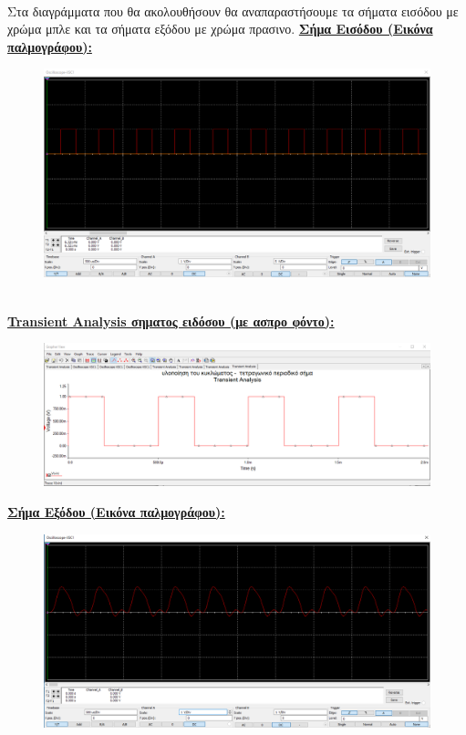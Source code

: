 \documentclass{article}
\begin{document}
{\begin{figure}[h!]
\end{figure} 
\\
Στα διαγράμματα που θα ακολουθήσουν θα αναπαραστήσουμε τα σήματα εισόδου με χρώμα μπλε και τα σήματα εξόδου με χρώμα πρασινο.
\clearpage
\textbf{\underline{Σήμα Εισόδου (Εικόνα παλμογράφου):}}
\begin{figure}[h!]
\centering
 	\advance\leftskip-3cm
  \includegraphics[width=180mm,scale=2]{input.png}
\end{figure} \\
\textbf{\underline{Transient Analysis σηματος ειδόσου (με ασπρο φόντο):}}
\begin{figure}[h!]
\centering
 	\advance\leftskip-2cm
  \includegraphics[width=160mm,scale=2]{input2.png}
\end{figure} 
\clearpage
\textbf{\underline{Σήμα Εξόδου (Εικόνα παλμογράφου):}}
\begin{figure}[h!]
\centering
 	\advance\leftskip-3cm
  \includegraphics[width=180mm,scale=2]{output.png}

\end{figure}}
\end{document}
